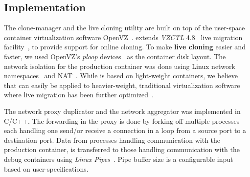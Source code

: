 \subsection{Implementation}
\label{sec:parikshanImplementation}
The clone-manager and the live cloning utility are built on top of the user-space container virtualization software OpenVZ~\cite{openvz}.
\parikshan extends \emph{VZCTL} 4.8~\cite{vzctl} live migration facility~\cite{mirkin2008containers}, to provide support for online cloning.
To make \textbf{live cloning} easier and faster, we used OpenVZ's \textit{ploop} devices~\cite{ploop} as the container disk layout.
The network isolation for the production container was done using Linux network namespaces~\cite{netns} and NAT~\cite{nat}.
While \parikshan is based on light-weight containers, we believe that \parikshan can easily be applied to heavier-weight, traditional virtualization software where live migration has been further optimized~\cite{liveVMprinciples,trafficliveVM}.

The network proxy duplicator and the network aggregator was implemented in C/C++.
The forwarding in the proxy is done by forking off multiple processes each handling one send/or receive a connection in a loop from a source port to a destination port.
Data from processes handling communication with the production container, is transferred to those handling communication with the debug containers using \emph{Linux Pipes}~\cite{linuxpipes}.
Pipe buffer size is a configurable input based on user-specifications.

